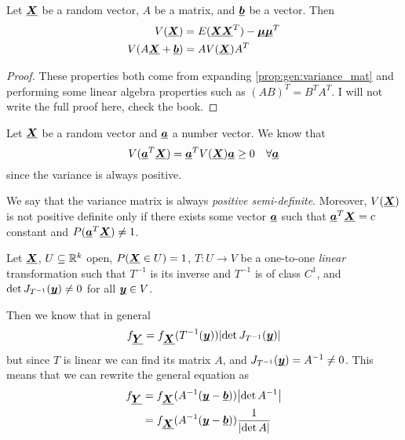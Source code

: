 \documentclass[12pt]{extarticle}
\renewcommand{\vec}[1]{\uvec{#1}}
\begin{document}
\begin{theorem}
    Let $\vec X$ be a random vector, $A$ be a matrix, and $\vec b$ be a vector.
    Then
    \begin{align}
        V(\vec X)            & = E(\vec X \vec X^T) - \vec \mu \vec \mu^T \\
        V(A \vec X + \vec b) & = A V(\vec X) A^T
    \end{align}
\end{theorem}

\begin{proof}
    These properties both come from expanding \autoref{prop:gen:variance_mat} and performing some linear algebra properties such as $(AB)^T = B^T A^T$.
    I will not write the full proof here, check the book.
\end{proof}

\begin{proposition}
    Let $\vec X$ be a random vector and $\vec a$ a number vector.
    We know that
    \begin{equation}
        V(\vec a^T \vec X) = \vec a^T V(\vec X) \vec a \geq 0 \quad \forall \vec a
    \end{equation}
    since the variance is always positive.

    We say that the variance matrix is always \emph{positive semi-definite}.
    Moreover, $V(\vec X)$ is not positive definite only if there exists some vector $\vec a$ such that $\vec a^T \vec X = c$ constant and $P(\vec a^T \vec X) \ne 1$.
\end{proposition}

\begin{proposition}
    Let $\vec X$, $U \subseteq \mathbb{R}^k$ open, $P(\vec X \in U) = 1$, $T: U \to V$ be a one-to-one \emph{linear} transformation such that $T^{-1}$ is its inverse and $T^{-1}$ is of class $C^1$, and $\det J_{T^{-1}}(\vec y) \ne 0$ for all $\vec y \in V$.

    Then we know that in general
    \begin{equation}
        f_{\vec Y} = f_{\vec X}(T^{-1}(\vec y)) \abs{\det J_{T^{-1}}(\vec y)}
    \end{equation}
    but since $T$ is linear we can find its matrix $A$, and $J_{T^{-1}}(\vec y) = A^{-1} \ne 0$.
    This means that we can rewrite the general equation as
    \begin{align}
        f_{\vec Y} & = f_{\vec X}(A^{-1}(\vec y - \vec b)) \abs{\det A^{-1}}      \\
                   & = f_{\vec X}(A^{-1}(\vec y - \vec b)) \frac{1}{\abs{\det A}}
    \end{align}
\end{proposition}
\end{document}
